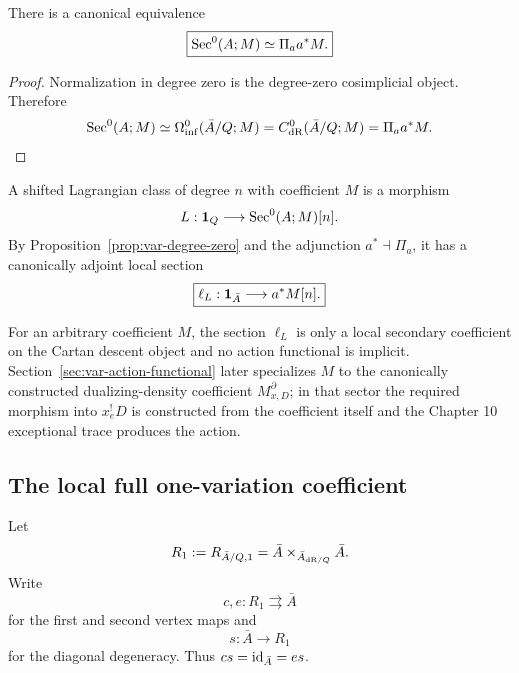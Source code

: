 \begin{proposition}
\label{prop:var-degree-zero}
There is a canonical equivalence
\[
    \boxed{
    \operatorname{Sec}^0(A;M)
    \simeq
    \Pi_a a^*M.
    }
\]
\end{proposition}

\begin{proof}
Normalization in degree zero is the degree-zero cosimplicial object. Therefore
\[
    \operatorname{Sec}^0(A;M)
    \simeq
    \Omega_{\mathrm{inf}}^0(\bar A/Q;M)
    =
    C_{\mathrm{dR}}^0(\bar A/Q;M)
    =
    \Pi_a a^*M.
\]
\end{proof}

\begin{definition}
\label{def:var-lagrangian}
A shifted Lagrangian class of degree \(n\) with coefficient \(M\) is a morphism
\[
    L:\mathbf 1_Q\longrightarrow\operatorname{Sec}^0(A;M)[n].
\]
By Proposition~\ref{prop:var-degree-zero} and the adjunction \(a^*\dashv\Pi_a\), it has a canonically adjoint local section
\[
    \boxed{
    \ell_L:\mathbf 1_{\bar A}\longrightarrow a^*M[n].
    }
\]
\end{definition}

\begin{remark}
\label{rem:var-lagrangian-action}
For an arbitrary coefficient \(M\), the section \(\ell_L\) is only a local secondary coefficient on the Cartan descent object and no action functional is implicit. Section~\ref{sec:var-action-functional} later specializes \(M\) to the canonically constructed dualizing-density coefficient \(M^\partial_{x,D}\); in that sector the required morphism into \(x_e^!D\) is constructed from the coefficient itself and the Chapter 10 exceptional trace produces the action.
\end{remark}

\subsection{The local full one-variation coefficient}

Let
\[
    R_1:=R_{\bar A/Q,1}
    =
    \bar A\times_{\bar A_{\mathrm{dR}/Q}}\bar A.
\]
Write
\[
    c,e:R_1\rightrightarrows\bar A
\]
for the first and second vertex maps and
\[
    s:\bar A\longrightarrow R_1
\]
for the diagonal degeneracy. Thus \(cs=\operatorname{id}_{\bar A}=es\).


